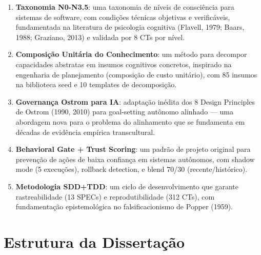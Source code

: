 \begin{enumerate}
    \item \textbf{Taxonomia N0-N3.5}: uma taxonomia de níveis de consciência para sistemas de software, com condições técnicas objetivas e verificáveis, fundamentada na literatura de psicologia cognitiva (Flavell, 1979; Baars, 1988; Graziano, 2013) e validada por 8 CTs por nível.
    \item \textbf{Composição Unitária do Conhecimento}: um método para decompor capacidades abstratas em insumos cognitivos concretos, inspirado na engenharia de planejamento (composição de custo unitário), com 85 insumos na biblioteca seed e 10 templates de decomposição.
    \item \textbf{Governança Ostrom para IA}: adaptação inédita dos 8 Design Principles de Ostrom (1990, 2010) para goal-setting autônomo alinhado — uma abordagem nova para o problema do alinhamento que se fundamenta em décadas de evidência empírica transcultural.
    \item \textbf{Behavioral Gate + Trust Scoring}: um padrão de projeto original para prevenção de ações de baixa confiança em sistemas autônomos, com shadow mode (5 execuções), rollback detection, e blend 70/30 (recente/histórico).
    \item \textbf{Metodologia SDD+TDD}: um ciclo de desenvolvimento que garante rastreabilidade (13 SPECs) e reprodutibilidade (312 CTs), com fundamentação epistemológica no falsificacionismo de Popper (1959).
\end{enumerate}

\section{Estrutura da Dissertação}

